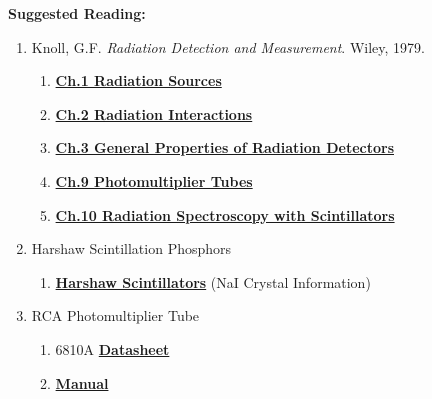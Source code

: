 \documentclass{../lab}
\begin{document}
\noindent\textbf{Suggested Reading:}
\begin{enumerate}

     \item Knoll, G.F. \emph{Radiation Detection and Measurement}. Wiley, 1979.
    \begin{enumerate}

        \item        \href{https://drive.google.com/file/d/1e9749PeXTsMDctZA9YjtGe7nKMj6gj-e/view?usp=drive_link}{\textbf{Ch.1 Radiation Sources}}
    
        \item
        \href{https://drive.google.com/file/d/1OVyNDtPH2b4DAmpoF-W8SDDqO96Ps6Gr/view?usp=drive_link}{\textbf{Ch.2 Radiation Interactions}}

        \item
        \href{https://drive.google.com/file/d/1slm-rP1zll9ptP1PwxVsSA_lrpf3UMl_/view?usp=drive_link}{\textbf{Ch.3 General Properties of Radiation Detectors}}

        \item        \href{https://drive.google.com/file/d/1e9749PeXTsMDctZA9YjtGe7nKMj6gj-e/view?usp=drive_link}{\textbf{Ch.9 Photomultiplier Tubes}}
        
        \item        \href{https://drive.google.com/file/d/1hL2bp21Cg0m2iJ34S5yGEmVo5298FAvh/view?usp=drive_link}{\textbf{Ch.10 Radiation Spectroscopy with Scintillators}}

        \end{enumerate}

    \item Harshaw Scintillation Phosphors
    \begin{enumerate}
        
        \item        \href{https://drive.google.com/file/d/1gfpUQ791fxsCu9Hr39XFgO7hGKz3agLJ/view?usp=drive_link}{\textbf{Harshaw Scintillators}} (NaI Crystal Information)

    \end{enumerate}
    
    \item RCA Photomultiplier Tube
    \begin{enumerate}
        
        \item 6810A        \href{https://drive.google.com/file/d/1iAtx9ldggR1MaUwRghCeHqJyUHIAPnxo/view?usp=drive_link}{\textbf{Datasheet}}

        \item
        \href{https://drive.google.com/file/d/1nuelDqhdO-MvjZOrWZEEvHxdeYYSY05h/view?usp=drive_link}{\textbf{Manual}}

    \end{enumerate}
    
\end{enumerate}
\end{document}
